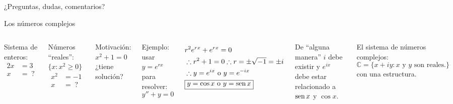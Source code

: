 \documentclass[9pt, aspectratio=169]{beamer}
\begin{document}
\begin{frame}[standout]
    \centering
    ¿Preguntas, dudas, comentarios?
\end{frame}

\begin{frame}{Los números complejos}
 \begin{columns}[t]
  Sistema de enteros:
  \begin{align*}
  2 x &= 3 \\
  x &= \;?
  \end{align*}
  
  Números ``reales'': $\{ x: x^2 \geq 0\}$
  \begin{align*}
   x^2 &= -1 \\
   x &= \;?
  \end{align*}
  
  Motivación: $ x^2 + 1 = 0 $ ¿tiene solución?
  
  Ejemplo: usar $y = e^{rx}$ para resolver:
  \[  y'' + y = 0 \]
  
  \begin{align*}
   & r^2 e^{rx} + e^{rx} = 0 \\
   & \therefore r^2 + 1 = 0 \therefore r = \pm \sqrt{-1} = \pm i \\
   & \therefore y = e^{ix} \text{ o } y = e^{-ix} \\
   & \boxed{y = \cos x \text{ o } y = \operatorname{sen} x}
  \end{align*}
  
  De ``alguna manera'' $i$ debe existir y $e^{ix}$ debe estar relacionado a $\operatorname{sen} x$ y $\cos x$.
  
  El sistema de \alert{números complejos}:
  \[ \mathbb{C} = \{ x + i y : x \text{ y } y \text{ son reales.} \} \]
  con una estructura.
  

\end{columns}
\end{frame}
\end{document}
